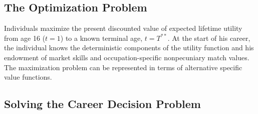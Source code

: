 \documentclass[12pt]{article}
\newcommand{\CiteReference}{../reference.bib}
\theoremstyle{definition}
\begin{document}
\subsection{The Optimization Problem}

Individuals maximize the present discounted value of expected lifetime utility from age 16 ($t=1$) to a known terminal age, $t = T^{**}$. At the start of his career, the individual knows the deterministic components of the utility function and his endowment of market skills and occupation-specific nonpecuniary match values. The maximization problem can be represented in terms of alternative specific value functions.

\subsection{Solving the Career Decision Problem}




\end{document}
